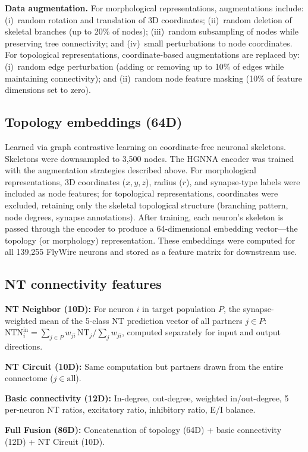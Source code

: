 \documentclass[10pt]{article}
\begin{document}
\textbf{Data augmentation.} For morphological representations, augmentations include: (i)~random rotation and translation of 3D coordinates; (ii)~random deletion of skeletal branches (up to 20\% of nodes); (iii)~random subsampling of nodes while preserving tree connectivity; and (iv)~small perturbations to node coordinates. For topological representations, coordinate-based augmentations are replaced by: (i)~random edge perturbation (adding or removing up to 10\% of edges while maintaining connectivity); and (ii)~random node feature masking (10\% of feature dimensions set to zero).

\subsection*{Topology embeddings (64D)}
Learned via graph contrastive learning on coordinate-free neuronal skeletons. Skeletons were downsampled to 3,500 nodes. The HGNNA encoder was trained with the augmentation strategies described above. For morphological representations, 3D coordinates ($x, y, z$), radius ($r$), and synapse-type labels were included as node features; for topological representations, coordinates were excluded, retaining only the skeletal topological structure (branching pattern, node degrees, synapse annotations). After training, each neuron's skeleton is passed through the encoder to produce a 64-dimensional embedding vector---the topology (or morphology) representation. These embeddings were computed for all 139,255 FlyWire neurons and stored as a feature matrix for downstream use.

\subsection*{NT connectivity features}
\textbf{NT Neighbor (10D):} For neuron $i$ in target population $P$, the synapse-weighted mean of the 5-class NT prediction vector of all partners $j \in P$: $\mathrm{NTN}_i^{\mathrm{in}} = \sum_{j \in P} w_{ji}\, \mathrm{NT}_j / \sum_{j} w_{ji}$, computed separately for input and output directions.

\textbf{NT Circuit (10D):} Same computation but partners drawn from the entire connectome ($j \in \mathrm{all}$).

\textbf{Basic connectivity (12D):} In-degree, out-degree, weighted in/out-degree, 5 per-neuron NT ratios, excitatory ratio, inhibitory ratio, E/I balance.

\textbf{Full Fusion (86D):} Concatenation of topology (64D) + basic connectivity (12D) + NT Circuit (10D).
\end{document}
